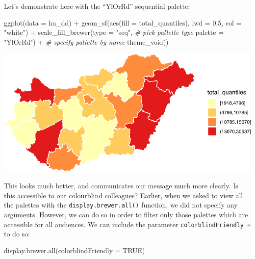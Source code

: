 \documentclass[
]{book}
\newenvironment{Shaded}{\begin{snugshade}}{\end{snugshade}}
\newcommand{\AttributeTok}[1]{\textcolor[rgb]{0.77,0.63,0.00}{#1}}
\newcommand{\CommentTok}[1]{\textcolor[rgb]{0.56,0.35,0.01}{\textit{#1}}}
\newcommand{\ConstantTok}[1]{\textcolor[rgb]{0.00,0.00,0.00}{#1}}
\newcommand{\FloatTok}[1]{\textcolor[rgb]{0.00,0.00,0.81}{#1}}
\newcommand{\FunctionTok}[1]{\textcolor[rgb]{0.00,0.00,0.00}{#1}}
\newcommand{\NormalTok}[1]{#1}
\newcommand{\SpecialCharTok}[1]{\textcolor[rgb]{0.00,0.00,0.00}{#1}}
\newcommand{\StringTok}[1]{\textcolor[rgb]{0.31,0.60,0.02}{#1}}
\begin{document}
Let's demonstrate here with the ``YlOrRd'' sequential palette:

\begin{Shaded}
\begin{Highlighting}[]
\FunctionTok{ggplot}\NormalTok{(}\AttributeTok{data =}\NormalTok{ hu\_dd) }\SpecialCharTok{+} 
  \FunctionTok{geom\_sf}\NormalTok{(}\FunctionTok{aes}\NormalTok{(}\AttributeTok{fill =}\NormalTok{ total\_quantiles), }
          \AttributeTok{lwd =} \FloatTok{0.5}\NormalTok{, }
          \AttributeTok{col =} \StringTok{"white"}\NormalTok{) }\SpecialCharTok{+} 
  \FunctionTok{scale\_fill\_brewer}\NormalTok{(}\AttributeTok{type =} \StringTok{"seq"}\NormalTok{,   }\CommentTok{\# pick pallette type}
                    \AttributeTok{palette =} \StringTok{"YlOrRd"}\NormalTok{) }\SpecialCharTok{+}  \CommentTok{\# specify pallette by name}
  \FunctionTok{theme\_void}\NormalTok{()}
\end{Highlighting}
\end{Shaded}

\includegraphics{crime_mapping_files/figure-latex/colourbbrewerratefill-1.pdf}

This looks much better, and communicates our message much more clearly. Is this accessible to our colourblind colleagues? Earlier, when we asked to view all the palettes with the \texttt{display.brewer.all()} function, we did not specify any arguments. However, we can do so in order to filter only those palettes which are accessible for all audiences. We can include the parameter \texttt{colorblindFriendly\ =} to do so:

\begin{Shaded}
\begin{Highlighting}[]
\FunctionTok{display.brewer.all}\NormalTok{(}\AttributeTok{colorblindFriendly =} \ConstantTok{TRUE}\NormalTok{)}
\end{Highlighting}
\end{Shaded}
\end{document}
